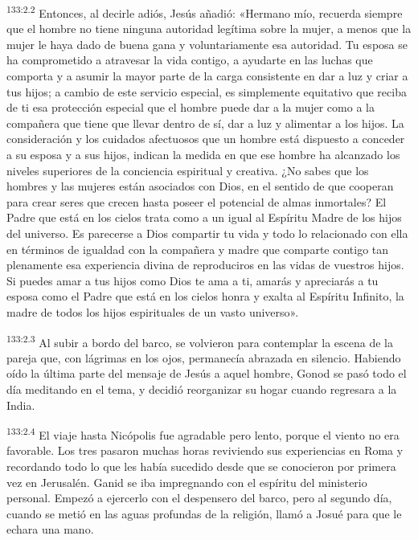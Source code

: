 \par
\textsuperscript{133:2.2} Entonces, al decirle adiós, Jesús añadió: «Hermano mío, recuerda siempre que el hombre no tiene ninguna autoridad legítima sobre la mujer, a menos que la mujer le haya dado de buena gana y voluntariamente esa autoridad. Tu esposa se ha comprometido a atravesar la vida contigo, a ayudarte en las luchas que comporta y a asumir la mayor parte de la carga consistente en dar a luz y criar a tus hijos; a cambio de este servicio especial, es simplemente equitativo que reciba de ti esa protección especial que el hombre puede dar a la mujer como a la compañera que tiene que llevar dentro de sí, dar a luz y alimentar a los hijos. La consideración y los cuidados afectuosos que un hombre está dispuesto a conceder a su esposa y a sus hijos, indican la medida en que ese hombre ha alcanzado los niveles superiores de la conciencia espiritual y creativa. ¿No sabes que los hombres y las mujeres están asociados con Dios, en el sentido de que cooperan para crear seres que crecen hasta poseer el potencial de almas inmortales? El Padre que está en los cielos trata como a un igual al Espíritu Madre de los hijos del universo. Es parecerse a Dios compartir tu vida y todo lo relacionado con ella en términos de igualdad con la compañera y madre que comparte contigo tan plenamente esa experiencia divina de reproduciros en las vidas de vuestros hijos. Si puedes amar a tus hijos como Dios te ama a ti, amarás y apreciarás a tu esposa como el Padre que está en los cielos honra y exalta al Espíritu Infinito, la madre de todos los hijos espirituales de un vasto universo».

\par
\textsuperscript{133:2.3} Al subir a bordo del barco, se volvieron para contemplar la escena de la pareja que, con lágrimas en los ojos, permanecía abrazada en silencio. Habiendo oído la última parte del mensaje de Jesús a aquel hombre, Gonod se pasó todo el día meditando en el tema, y decidió reorganizar su hogar cuando regresara a la India.

\par
\textsuperscript{133:2.4} El viaje hasta Nicópolis fue agradable pero lento, porque el viento no era favorable. Los tres pasaron muchas horas reviviendo sus experiencias en Roma y recordando todo lo que les había sucedido desde que se conocieron por primera vez en Jerusalén. Ganid se iba impregnando con el espíritu del ministerio personal. Empezó a ejercerlo con el despensero del barco, pero al segundo día, cuando se metió en las aguas profundas de la religión, llamó a Josué para que le echara una mano.

